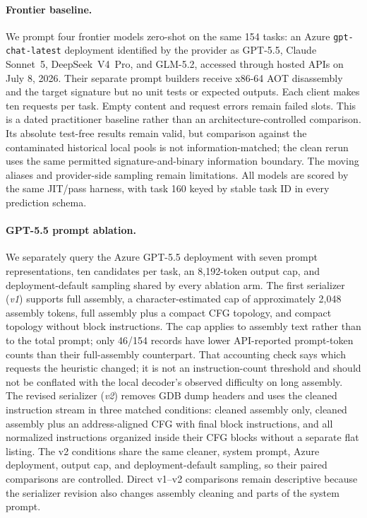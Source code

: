 \documentclass[11pt]{article}
\begin{document}
\paragraph{Frontier baseline.} We prompt four frontier models zero-shot on the same 154 tasks: an Azure \texttt{gpt-chat-latest} deployment identified by the provider as GPT-5.5, Claude Sonnet~5, DeepSeek~V4~Pro, and GLM-5.2, accessed through hosted APIs on July 8, 2026. Their separate prompt builders receive x86-64 AOT disassembly and the target signature but no unit tests or expected outputs. Each client makes ten requests per task. Empty content and request errors remain failed slots. This is a dated practitioner baseline rather than an architecture-controlled comparison. Its absolute test-free results remain valid, but comparison against the contaminated historical local pools is not information-matched; the clean rerun uses the same permitted signature-and-binary information boundary. The moving aliases and provider-side sampling remain limitations. All models are scored by the same JIT/pass harness, with task 160 keyed by stable task ID in every prediction schema.

\paragraph{GPT-5.5 prompt ablation.} We separately query the Azure GPT-5.5 deployment with seven prompt representations, ten candidates per task, an 8{,}192-token output cap, and deployment-default sampling shared by every ablation arm. The first serializer (\emph{v1}) supports full assembly, a character-estimated cap of approximately 2{,}048 assembly tokens, full assembly plus a compact CFG topology, and compact topology without block instructions. The cap applies to assembly text rather than to the total prompt; only 46/154 records have lower API-reported prompt-token counts than their full-assembly counterpart. That accounting check says which requests the heuristic changed; it is not an instruction-count threshold and should not be conflated with the local decoder's observed difficulty on long assembly. The revised serializer (\emph{v2}) removes GDB dump headers and uses the cleaned instruction stream in three matched conditions: cleaned assembly only, cleaned assembly plus an address-aligned CFG with final block instructions, and all normalized instructions organized inside their CFG blocks without a separate flat listing. The v2 conditions share the same cleaner, system prompt, Azure deployment, output cap, and deployment-default sampling, so their paired comparisons are controlled. Direct v1--v2 comparisons remain descriptive because the serializer revision also changes assembly cleaning and parts of the system prompt.
\end{document}

